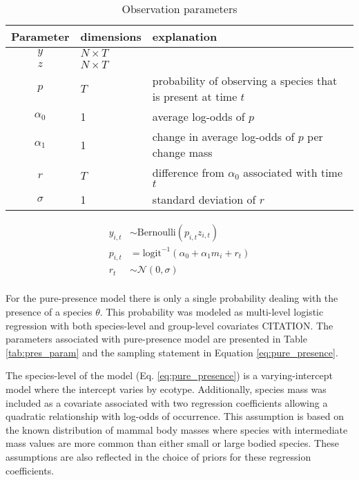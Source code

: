 \documentclass[12pt,letterpaper]{article}
\begin{document}
\begin{table}
  \centering
  \begin{tabular}{c l l}
    Parameter & dimensions & explanation \\
    \hline
    \(y\) & \(N \times T\) & \\
    \(z\) & \(N \times T\) & \\
    \(p\) & \(T\) & probability of observing a species that is present at time \(t\) \\
    \(\alpha_{0}\) & 1 & average log-odds of \(p\) \\ %
    \(\alpha_{1}\) & 1 & change in average log-odds of \(p\) per change mass \\
    \(r\) & \(T\) & difference from \(\alpha_{0}\) associated with time \(t\) \\
    \(\sigma\) & 1 & standard deviation of \(r\) \\
  \end{tabular}
  \caption{Observation parameters}
  \label{tab:obs_param}
\end{table}

\begin{equation}
  \begin{aligned}
    y_{i, t} &\sim \text{Bernoulli}(p_{i, t} z_{i, t}) \\
    p_{i, t} &= \text{logit}^{-1}(\alpha_{0} + \alpha_{1} m_{i} + r_{t}) \\ 
    r_{t} &\sim \mathcal{N}(0, \sigma) \\
  \end{aligned}
  \label{eq:obs_model}
\end{equation}



For the pure-presence model there is only a single probability dealing with the presence of a species \(\theta\). This probability was modeled as multi-level logistic regression with both species-level and group-level covariates CITATION. The parameters associated with pure-presence model are presented in Table \ref{tab:pres_param} and the sampling statement in Equation \ref{eq:pure_presence}.

The species-level of the model (Eq. \ref{eq:pure_presence}) is a varying-intercept model where the intercept varies by ecotype. Additionally, species mass was included as a covariate associated with two regression coefficients allowing a quadratic relationship with log-odds of occurrence. This assumption is based on the known distribution of mammal body masses where species with intermediate mass values are more common than either small or large bodied species. These assumptions are also reflected in the choice of priors for these regression coefficients.
\end{document}
